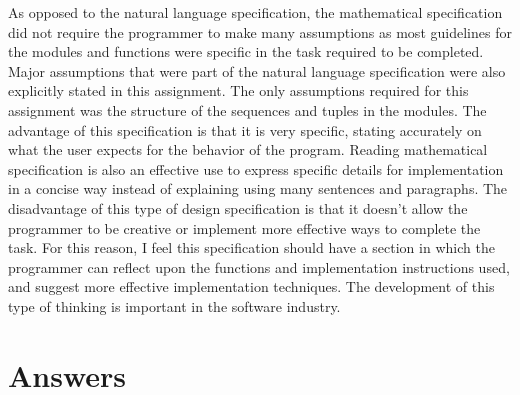 \documentclass[12pt]{article}
\begin{document}
As opposed to the natural language specification, the mathematical specification did not require the programmer to make many assumptions as most
guidelines for the modules and functions were specific in the task required to be completed. Major assumptions that were part of the natural language specification
were also explicitly stated in this assignment. The only assumptions required for this assignment was the structure of the sequences and tuples in the modules. The advantage 
of this specification is that it is very specific, stating accurately on what the user expects for the behavior of the program. Reading mathematical specification is also an effective
use to express specific details for implementation in a concise way instead of explaining using many sentences and paragraphs. The disadvantage of this type of design specification is that
it doesn't allow the programmer to be creative or implement more effective ways to complete the task. For this reason, I feel this specification should have a section in which the programmer 
can reflect upon the functions and implementation instructions used, and suggest more effective implementation techniques. The development of this type of thinking is important in the software 
industry.


\section{Answers}
\end{document}
